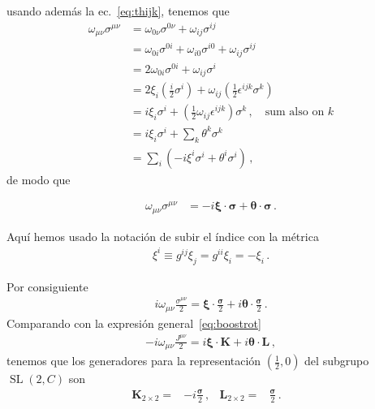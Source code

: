 usando además la ec.~\eqref{eq:thijk}, tenemos que
\begin{align*}
\omega_{\mu \nu} \sigma^{\mu \nu} &=\omega_{0 \nu} \sigma^{0 \nu}+\omega_{ij} \sigma^{i j} \\
&=\omega_{0 i} \sigma^{0i}+\omega_{i 0} \sigma^{i 0}+\omega_{i j} \sigma^{i j} \\
&=2 \omega_{0 i} \sigma^{0 i}+\omega_{i j} \sigma^{i} \\
&=2 \xi_{i}\left(\frac{i}{2} \sigma^{i}\right)+\omega_{i j}\left(\frac{1}{2} \epsilon^{i j k} \sigma^{k}\right) \\
&=i \xi_{i} \sigma^{i}+\left(\frac{1}{2} \omega_{i j} \epsilon^{i j k}\right) \sigma^{k}\,,\quad\text{sum also on $k$}\\
                                  &=i \xi_{i} \sigma^{i}+\sum_k\theta^{k} \sigma^{k}\\
                                  &=\sum_i \left(  -i \xi^{i} \sigma^{i}+\theta^{i} \sigma^{i}\right)\,,
\end{align*}
de modo que
\begin{frame}
\begin{align*}
    \omega_{\mu \nu} \sigma^{\mu \nu} &=-i \boldsymbol{\xi}\cdot \boldsymbol{\sigma}+
                                      \boldsymbol{\theta}\cdot \boldsymbol{\sigma}\,.
\end{align*}

Aquí hemos usado la notación de subir el índice con la métrica
\begin{align*}
  \xi^i\equiv g^{ij}\xi_j=g^{ii}\xi_i=-\xi_i\,.
\end{align*}

Por consiguiente
\begin{align*}
  i \omega_{\mu\nu} \frac{\sigma^{\mu \nu} }{2}= \boldsymbol{\xi}\cdot \frac{\boldsymbol{\sigma}}{2}+
                                      i\boldsymbol{\theta}\cdot \frac{\boldsymbol{\sigma}}{2}\,.
\end{align*}
Comparando con la expresión general~\eqref{eq:boostrot}
\begin{align*}
  -i\omega_{\mu\nu}\frac{{J}^{\mu\nu}}{2} =i\boldsymbol{\xi}\cdot \boldsymbol{K}
    +i\boldsymbol{\theta}\cdot \boldsymbol{L}\,,
\end{align*}
tenemos que los generadores para la representación $(\frac{1}{2},0)$ del subgrupo $\operatorname{SL}(2,C)$ son
\begin{align*}
\boldsymbol{K}_{2\times2}=&-i \frac{\boldsymbol{\sigma}}{2}\,,&
\boldsymbol{L}_{2\times2}=& \frac{\boldsymbol{\sigma}}{2}\,.&
\end{align*}
\end{frame}



